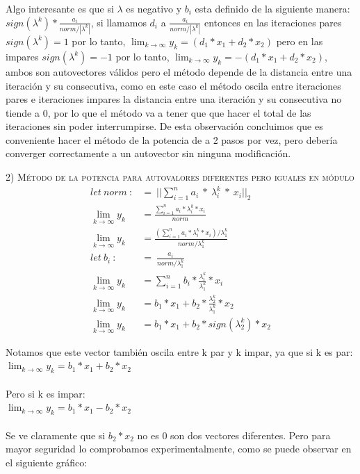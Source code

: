 \vspace{1em}



Algo interesante es que si $\lambda$ es negativo y $b_i$ esta definido de la siguiente manera: $sign(\lambda^{k}) * \frac{a_i}{norm / |\lambda^{k}|}$, si llamamos $d_i$ a $\frac{a_i}{norm / |\lambda^{k}|}$ entonces en las iteraciones pares $sign(\lambda^{k}) = 1$ por lo tanto, $\lim_{k \to \infty} y_k = (d_1 * x_1 + d_2 * x_2)$ pero en las impares $sign(\lambda^{k}) = -1$ por lo tanto, $\lim_{k \to \infty} y_k = -(d_1 * x_1 + d_2 * x_2)$, ambos son autovectores válidos pero el método depende de la distancia entre una iteración y su consecutiva, como en este caso el método oscila entre iteraciones pares e iteraciones impares la distancia entre una iteración y su consecutiva no tiende a 0, por lo que el método va a tener que que hacer el total de las iteraciones sin poder interrumpirse. De esta observación concluimos que es conveniente hacer el método de la potencia de a 2 pasos por vez, pero debería converger correctamente a un autovector sin ninguna modificación.


\noindent \textsc{2) Método de la potencia para autovalores diferentes pero iguales en módulo}
\begin{align}
    let \ norm \ :&= \ ||\sum_{i=1}^{n} a_i \ * \ \lambda_{i}^{k} \ * \ x_i||_2 \\
    \lim_{k \to \infty} y_k &= \frac{\sum_{i=1}^{n} a_i * \lambda_{i}^{k} * x_i }{norm} \\ 
    \lim_{k \to \infty} y_k &= \frac{(\sum_{i=1}^{n} a_i * \lambda_{i}^{k} * x_i) / \lambda_{1}^{k}}{norm / \lambda_{1}^{k}} \\
    let \ b_i \ :&= \ \frac{a_i}{norm / \lambda_{1}^{k}} \\
    \lim_{k \to \infty} y_k &= \sum_{i=1}^{n} b_i * \frac{\lambda_{i}^{k}}{\lambda_{1}^{k}} * x_i \\
    \lim_{k \to \infty} y_k &= b_1 * x_1 + b_2 * \frac{\lambda_{2}^{k}}{\lambda_{1}^{k}} * x_2 \\
    \lim_{k \to \infty} y_k &= b_1 * x_1 + b_2 * sign(\lambda_{2}^{k}) * x_2 
\end{align}


\noindent Notamos que este vector también oscila entre k par y k impar, ya que si k es par: \\
\indent\indent $\lim_{k \to \infty} y_k = b_1 * x_1 + b_2 * x_2$ \\ \\
Pero si k es impar: \\
\indent \indent $\lim_{k \to \infty} y_k = b_1 * x_1 - b_2 * x_2$ \\ \\
Se ve claramente que si $b_2 * x_2$ no es 0 son dos vectores diferentes.
Pero para mayor seguridad lo comprobamos experimentalmente, como se puede observar en el siguiente gráfico:

